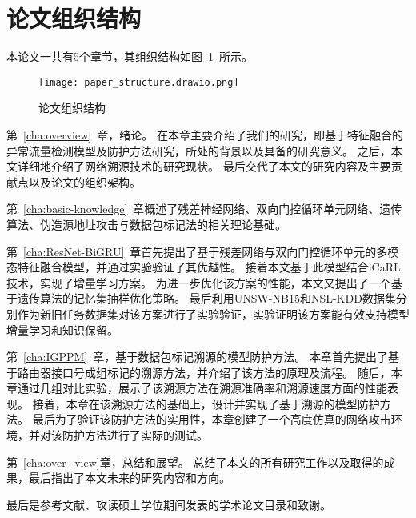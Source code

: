 \section{论文组织结构}
本论文一共有5个章节，其组织结构如图~\ref{fig:paper_structure}~所示。
\begin{figure}[h]
  \centering
  \texttt{[image: paper\_structure.drawio.png]}
  \caption{论文组织结构}
  \label{fig:paper_structure}
\end{figure}

第~\ref{cha:overview}~章，绪论。
在本章主要介绍了我们的研究，即基于特征融合的异常流量检测模型及防护方法研究，所处的背景以及具备的研究意义。
之后，本文详细地介绍了网络溯源技术的研究现状。
最后交代了本文的研究内容及主要贡献点以及论文的组织架构。


第~\ref{cha:basic-knowledge}~章概述了残差神经网络、双向门控循环单元网络、遗传算法、伪造源地址攻击与数据包标记法的相关理论基础。



第~\ref{cha:ResNet-BiGRU}~章首先提出了基于残差网络与双向门控循环单元的多模态特征融合模型，并通过实验验证了其优越性。
接着本文基于此模型结合iCaRL技术，实现了增量学习方案。
为进一步优化该方案的性能，本文又提出了一个基于遗传算法的记忆集抽样优化策略。
最后利用UNSW-NB15和NSL-KDD数据集分别作为新旧任务数据集对该方案进行了实验验证，实验证明该方案能有效支持模型增量学习和知识保留。

第~\ref{cha:IGPPM}~章，基于数据包标记溯源的模型防护方法。
本章首先提出了基于路由器接口号成组标记的溯源方法，并介绍了该方法的原理及流程。
随后，本章通过几组对比实验，展示了该溯源方法在溯源准确率和溯源速度方面的性能表现。
接着，本章在该溯源方法的基础上，设计并实现了基于溯源的模型防护方法。
最后为了验证该防护方法的实用性，本章创建了一个高度仿真的网络攻击环境，并对该防护方法进行了实际的测试。

第~\ref{cha:over_view}章，总结和展望。
总结了本文的所有研究工作以及取得的成果，最后指出了本文未来的研究内容和方向。

最后是参考文献、攻读硕士学位期间发表的学术论文目录和致谢。
